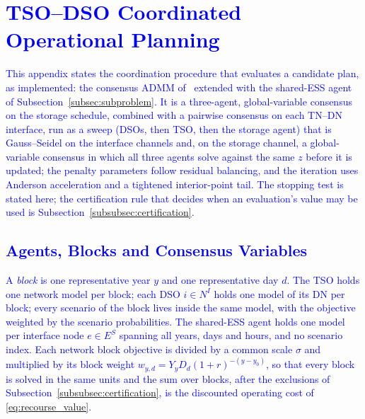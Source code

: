 \documentclass[preprint,12pt]{elsarticle}
\begin{document}

\appendix

\section{\textcolor{blue}{TSO--DSO Coordinated Operational Planning}}
\label{app:admm_updated}

\textcolor{blue}{
    This appendix states the coordination procedure that evaluates a candidate plan, as implemented: the consensus ADMM of~\cite{simoes_2023} extended with the shared-ESS agent of Subsection~\ref{subsec:subproblem}. It is a three-agent, global-variable consensus on the storage schedule, combined with a pairwise consensus on each TN--DN interface, run as a sweep (DSOs, then TSO, then the storage agent) that is Gauss--Seidel on the interface channels and, on the storage channel, a global-variable consensus in which all three agents solve against the same $z$ before it is updated; the penalty parameters follow residual balancing, and the iteration uses Anderson acceleration and a tightened interior-point tail.
    The stopping test is stated here; the certification rule that decides when an evaluation's value may be used is Subsection~\ref{subsubsec:certification}.
}

\subsection{\textcolor{blue}{Agents, Blocks and Consensus Variables}}
\label{app:admm_updated_agents}

\textcolor{blue}{
    A \emph{block} is one representative year $y$ and one representative day $d$. The TSO holds one network model per block; each DSO $i \in N^I$ holds one model of its DN per block; every scenario of the block lives inside the same model, with the objective weighted by the scenario probabilities. The shared-ESS agent holds one model per interface node $e \in E^S$ spanning all years, days and hours, and no scenario index. Each network block objective is divided by a common scale $\sigma$ and multiplied by its block weight $w_{y,d} = Y_y D_d (1+r)^{-(y-y_0)}$, so that every block is solved in the same units and the sum over blocks, after the exclusions of Subsection~\ref{subsubsec:certification}, is the discounted operating cost of \eqref{eq:recourse_value}.
}
\end{document}
